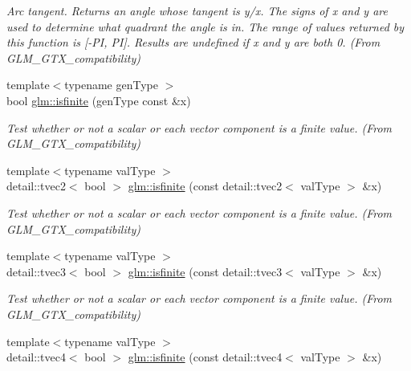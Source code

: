 \begin{DoxyCompactItemize}
\begin{DoxyCompactList}\small\item\em Arc tangent. Returns an angle whose tangent is y/x. The signs of x and y are used to determine what quadrant the angle is in. The range of values returned by this function is \mbox{[}-\/\+P\+I, P\+I\mbox{]}. Results are undefined if x and y are both 0. (From G\+L\+M\+\_\+\+G\+T\+X\+\_\+compatibility) \end{DoxyCompactList}\item 
\hypertarget{group__gtx__compatibility_ga39d6ffe6d42d4ec33036e735d7c39781}{}{\footnotesize template$<$typename gen\+Type $>$ }\\bool \hyperlink{group__gtx__compatibility_ga39d6ffe6d42d4ec33036e735d7c39781}{glm\+::isfinite} (gen\+Type const \&x)\label{group__gtx__compatibility_ga39d6ffe6d42d4ec33036e735d7c39781}

\begin{DoxyCompactList}\small\item\em Test whether or not a scalar or each vector component is a finite value. (From G\+L\+M\+\_\+\+G\+T\+X\+\_\+compatibility) \end{DoxyCompactList}\item 
\hypertarget{group__gtx__compatibility_ga27e1d577ba4d885bdc15ab9bfac0387c}{}{\footnotesize template$<$typename val\+Type $>$ }\\detail\+::tvec2$<$ bool $>$ \hyperlink{group__gtx__compatibility_ga27e1d577ba4d885bdc15ab9bfac0387c}{glm\+::isfinite} (const detail\+::tvec2$<$ val\+Type $>$ \&x)\label{group__gtx__compatibility_ga27e1d577ba4d885bdc15ab9bfac0387c}

\begin{DoxyCompactList}\small\item\em Test whether or not a scalar or each vector component is a finite value. (From G\+L\+M\+\_\+\+G\+T\+X\+\_\+compatibility) \end{DoxyCompactList}\item 
\hypertarget{group__gtx__compatibility_ga38d8d6db51bd5b3f91261c6d4ea579a4}{}{\footnotesize template$<$typename val\+Type $>$ }\\detail\+::tvec3$<$ bool $>$ \hyperlink{group__gtx__compatibility_ga38d8d6db51bd5b3f91261c6d4ea579a4}{glm\+::isfinite} (const detail\+::tvec3$<$ val\+Type $>$ \&x)\label{group__gtx__compatibility_ga38d8d6db51bd5b3f91261c6d4ea579a4}

\begin{DoxyCompactList}\small\item\em Test whether or not a scalar or each vector component is a finite value. (From G\+L\+M\+\_\+\+G\+T\+X\+\_\+compatibility) \end{DoxyCompactList}\item 
\hypertarget{group__gtx__compatibility_ga9d50259dc8fc3462ea2eb849ca9efd6e}{}{\footnotesize template$<$typename val\+Type $>$ }\\detail\+::tvec4$<$ bool $>$ \hyperlink{group__gtx__compatibility_ga9d50259dc8fc3462ea2eb849ca9efd6e}{glm\+::isfinite} (const detail\+::tvec4$<$ val\+Type $>$ \&x)\label{group__gtx__compatibility_ga9d50259dc8fc3462ea2eb849ca9efd6e}


\end{DoxyCompactItemize}
